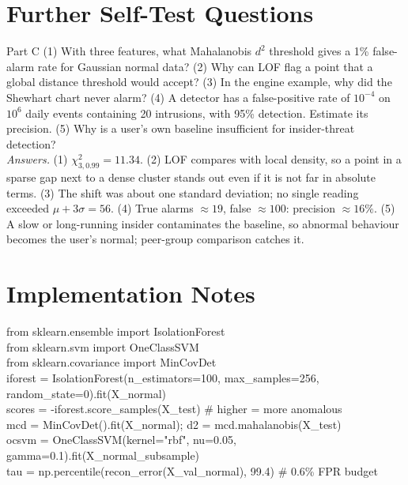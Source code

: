 \documentclass[11pt]{article}
\begin{document}
\section{Further Self-Test Questions}
\begin{question}{Part C}
(1) With three features, what Mahalanobis $d^2$ threshold gives a 1\% false-alarm rate for Gaussian normal data? (2) Why can LOF flag a point that a global distance threshold would accept? (3) In the engine example, why did the Shewhart chart never alarm? (4) A detector has a false-positive rate of $10^{-4}$ on $10^6$ daily events containing 20 intrusions, with 95\% detection. Estimate its precision. (5) Why is a user's own baseline insufficient for insider-threat detection?\\
\textit{Answers.} (1) $\chi^2_{3,0.99}=11.34$. (2) LOF compares with local density, so a point in a sparse gap next to a dense cluster stands out even if it is not far in absolute terms. (3) The shift was about one standard deviation; no single reading exceeded $\mu+3\sigma=56$. (4) True alarms $\approx19$, false $\approx100$: precision $\approx16\%$. (5) A slow or long-running insider contaminates the baseline, so abnormal behaviour becomes the user's normal; peer-group comparison catches it.
\end{question}

\section{Implementation Notes}
\begin{center}\begin{minipage}{0.92\textwidth}\small\ttfamily
from sklearn.ensemble import IsolationForest\\
from sklearn.svm import OneClassSVM\\
from sklearn.covariance import MinCovDet\\[2pt]
iforest = IsolationForest(n\_estimators=100, max\_samples=256, random\_state=0).fit(X\_normal)\\
scores = -iforest.score\_samples(X\_test) \quad \# higher = more anomalous\\
mcd = MinCovDet().fit(X\_normal); d2 = mcd.mahalanobis(X\_test)\\
ocsvm = OneClassSVM(kernel="rbf", nu=0.05, gamma=0.1).fit(X\_normal\_subsample)\\
tau = np.percentile(recon\_error(X\_val\_normal), 99.4) \quad \# 0.6\% FPR budget
\end{minipage}\end{center}
\end{document}
